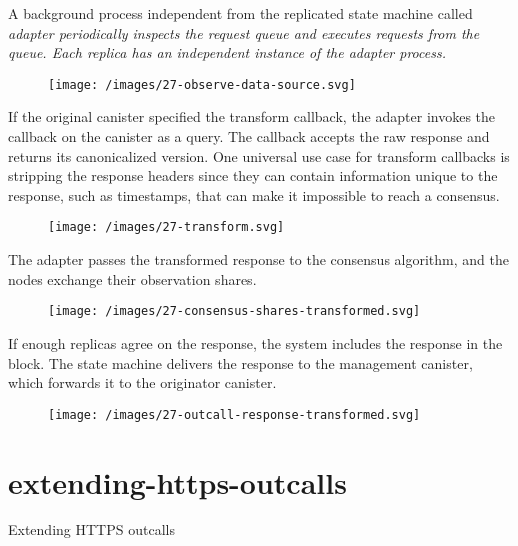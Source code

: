 \documentclass{article}
\begin{document}
A background process independent from the replicated state machine called \em{adapter} periodically inspects the request queue and executes requests from the queue.
Each replica has an independent instance of the adapter process.

\begin{figure}[grayscale-diagram,p75]
\texttt{[image: /images/27-observe-data-source.svg]}
\end{figure}

If the original canister specified the transform callback, the adapter invokes the callback on the canister as a query.
The callback accepts the raw  response and returns its canonicalized version.
One universal use case for transform callbacks is stripping the response headers since they can contain information unique to the response, such as timestamps, that can make it impossible to reach a consensus.

\begin{figure}[grayscale-diagram,p75]
\texttt{[image: /images/27-transform.svg]}
\end{figure}

The adapter passes the transformed response to the consensus algorithm, and the nodes exchange their observation shares.

\begin{figure}[grayscale-diagram,p75]
\label{fig-consensus-shares-transformed}
\texttt{[image: /images/27-consensus-shares-transformed.svg]}
\end{figure}

If enough replicas agree on the response, the system includes the response in the block.
The state machine delivers the response to the management canister, which forwards it to the originator canister.

\begin{figure}[grayscale-diagram,p75]
\texttt{[image: /images/27-outcall-response-transformed.svg]}
\end{figure}

\section{extending-https-outcalls}{Extending HTTPS outcalls}
\end{document}
